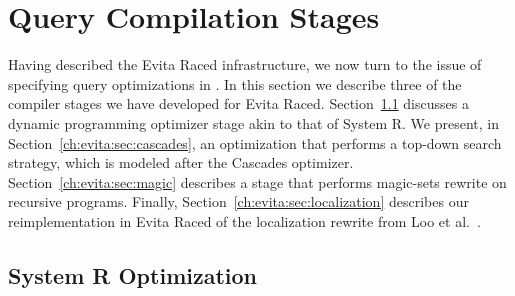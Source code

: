 \section{Query Compilation Stages}
\label{ch:evita:sec:stages}


Having described the Evita Raced infrastructure, we now turn to the issue of
specifying query optimizations in \OVERLOG.  In this section we describe three
of the compiler stages we have developed for Evita Raced.
Section~\ref{ch:evita:sec:systemr} discusses a dynamic programming optimizer
stage akin to that of System R.  We present, in
Section~\ref{ch:evita:sec:cascades}, an optimization that performs a top-down
search strategy, which is modeled after the Cascades optimizer.
Section~\ref{ch:evita:sec:magic} describes a stage that performs magic-sets
rewrite on recursive \OVERLOG programs.  Finally,
Section~\ref{ch:evita:sec:localization} describes our reimplementation in Evita
Raced of the localization rewrite from Loo et al.~\cite{loo-sigmod06}.

\subsection{System R Optimization}
\label{ch:evita:sec:systemr}

